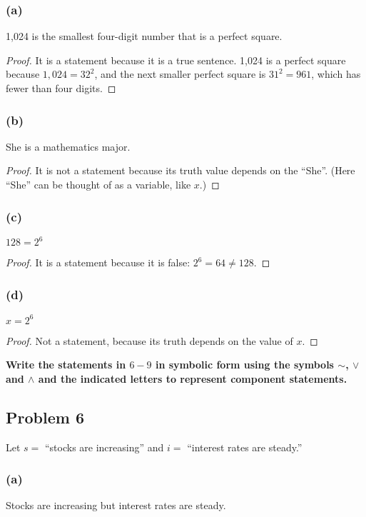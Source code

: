 \documentclass[14pt]{extarticle}
\begin{document}
\subsubsection{(a)}
1,024 is the smallest four-digit number that is a perfect square.

\begin{proof}
It is a statement because it is a true sentence. 1,024 is a perfect square because $1,024 = 32^2$, and the next smaller perfect square is $31^2 = 961$, which has fewer than four digits.
\end{proof}

\subsubsection{(b)}
She is a mathematics major.

\begin{proof}
It is not a statement because its truth value depends on the ``She''. (Here ``She'' can be thought of as a variable, like $x$.)
\end{proof}

\subsubsection{(c)}
$128 = 2^6$

\begin{proof}
It is a statement because it is false: $2^6 = 64 \neq 128$.
\end{proof}

\subsubsection{(d)}
$x = 2^6$

\begin{proof}
Not a statement, because its truth depends on the value of $x$.
\end{proof}

{\bf Write the statements in $6-9$ in symbolic form using the symbols $\sim$, $\vee$ and $\wedge$ and the indicated letters to represent component statements.}

\subsection{Problem 6}
Let $s =$ “stocks are increasing” and $i =$ “interest rates are steady.”

\subsubsection{(a)}
Stocks are increasing but interest rates are steady.
\end{document}
